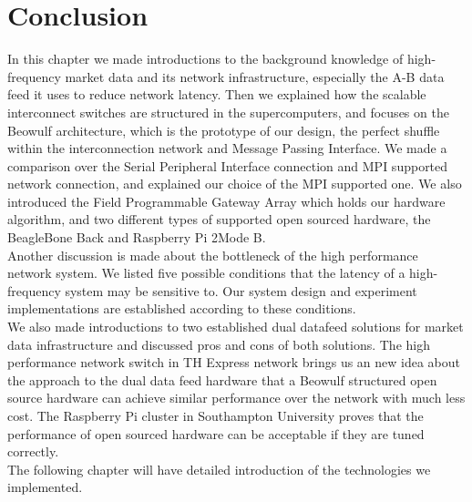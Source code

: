\documentclass[11pt,openright,a4paper]{report}
\begin{document}
\section{Conclusion}
In this chapter we made introductions to the background knowledge of high-frequency market data and its network infrastructure, especially the A-B data feed it uses to reduce network latency. Then we explained how the scalable interconnect switches are structured in the supercomputers, and focuses on the Beowulf architecture, which is the prototype of our design, the perfect shuffle within the interconnection network and Message Passing Interface. We made a comparison over the Serial Peripheral Interface connection and MPI supported network connection, and explained our choice of the MPI supported one. We also introduced the Field Programmable Gateway Array which holds our hardware algorithm, and two different types of supported open sourced hardware, the BeagleBone Back and Raspberry Pi 2Mode B.\\
Another discussion is made about the bottleneck of the high performance network system. We listed five possible conditions that the latency of a high-frequency system may be sensitive to. Our system design and experiment implementations are established according to these conditions.\\
We also made introductions to two established dual datafeed solutions for market data infrastructure and discussed pros and cons of both solutions. The high performance network switch in TH Express network brings us an new idea about the approach to the dual data feed hardware that a Beowulf structured open source hardware can achieve similar performance over the network with much less cost. The Raspberry Pi cluster in Southampton University proves that the performance of open sourced hardware can be acceptable if they are tuned correctly.\\ 
The following chapter will have detailed introduction of the technologies we implemented.\\ 
\end{document}
